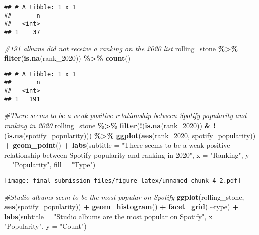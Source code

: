 \documentclass[
]{article}
\newenvironment{Shaded}{\begin{snugshade}}{\end{snugshade}}
\newcommand{\AttributeTok}[1]{\textcolor[rgb]{0.13,0.29,0.53}{#1}}
\newcommand{\CommentTok}[1]{\textcolor[rgb]{0.56,0.35,0.01}{\textit{#1}}}
\newcommand{\FunctionTok}[1]{\textcolor[rgb]{0.13,0.29,0.53}{\textbf{#1}}}
\newcommand{\NormalTok}[1]{#1}
\newcommand{\SpecialCharTok}[1]{\textcolor[rgb]{0.81,0.36,0.00}{\textbf{#1}}}
\newcommand{\StringTok}[1]{\textcolor[rgb]{0.31,0.60,0.02}{#1}}
\begin{document}
\begin{verbatim}
## # A tibble: 1 x 1
##       n
##   <int>
## 1    37
\end{verbatim}

\begin{Shaded}
\begin{Highlighting}[]
\CommentTok{\#191 albums did not receive a ranking on the 2020 list}
\NormalTok{rolling\_stone }\SpecialCharTok{\%\textgreater{}\%}
  \FunctionTok{filter}\NormalTok{(}\FunctionTok{is.na}\NormalTok{(rank\_2020)) }\SpecialCharTok{\%\textgreater{}\%}
  \FunctionTok{count}\NormalTok{()}
\end{Highlighting}
\end{Shaded}

\begin{verbatim}
## # A tibble: 1 x 1
##       n
##   <int>
## 1   191
\end{verbatim}

\begin{Shaded}
\begin{Highlighting}[]
\CommentTok{\#There seems to be a weak positive relationship between Spotify popularity and ranking in 2020}
\NormalTok{rolling\_stone }\SpecialCharTok{\%\textgreater{}\%}
  \FunctionTok{filter}\NormalTok{(}\SpecialCharTok{!}\NormalTok{(}\FunctionTok{is.na}\NormalTok{(rank\_2020)) }\SpecialCharTok{\&} \SpecialCharTok{!}\NormalTok{(}\FunctionTok{is.na}\NormalTok{(spotify\_popularity))) }\SpecialCharTok{\%\textgreater{}\%}
  \FunctionTok{ggplot}\NormalTok{(}\FunctionTok{aes}\NormalTok{(rank\_2020, spotify\_popularity)) }\SpecialCharTok{+}
  \FunctionTok{geom\_point}\NormalTok{() }\SpecialCharTok{+}
  \FunctionTok{labs}\NormalTok{(}\AttributeTok{subtitle =} \StringTok{"There seems to be a weak positive relationship between Spotify popularity and ranking in 2020"}\NormalTok{, }\AttributeTok{x =} \StringTok{"Ranking"}\NormalTok{, }\AttributeTok{y =} \StringTok{"Popularity"}\NormalTok{, }\AttributeTok{fill =} \StringTok{"Type"}\NormalTok{)}
\end{Highlighting}
\end{Shaded}

\texttt{[image: final\_submission\_files/figure-latex/unnamed-chunk-4-2.pdf]}

\begin{Shaded}
\begin{Highlighting}[]
\CommentTok{\#Studio albums seem to be the most popular on Spotify}
\FunctionTok{ggplot}\NormalTok{(rolling\_stone, }\FunctionTok{aes}\NormalTok{(spotify\_popularity)) }\SpecialCharTok{+}
  \FunctionTok{geom\_histogram}\NormalTok{() }\SpecialCharTok{+}
  \FunctionTok{facet\_grid}\NormalTok{(.}\SpecialCharTok{\textasciitilde{}}\NormalTok{type) }\SpecialCharTok{+}
  \FunctionTok{labs}\NormalTok{(}\AttributeTok{subtitle =} \StringTok{"Studio albums are the most popular on Spotify"}\NormalTok{, }\AttributeTok{x =} \StringTok{"Popularity"}\NormalTok{, }\AttributeTok{y =} \StringTok{"Count"}\NormalTok{)}
\end{Highlighting}
\end{Shaded}
\end{document}
